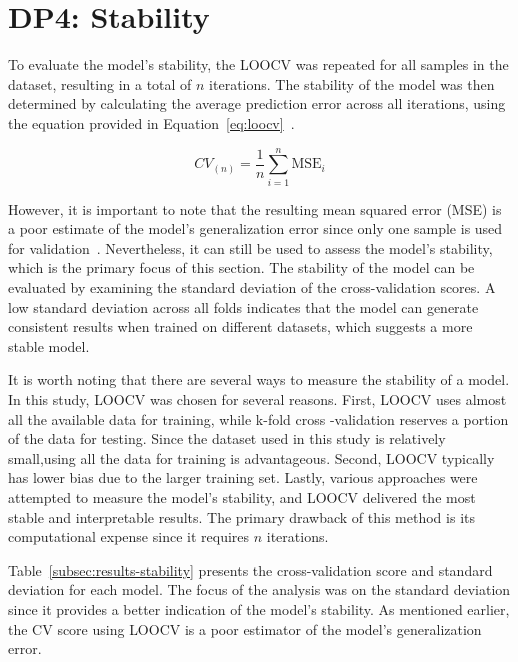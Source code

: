 \section{DP4: Stability}\label{sec:stability}

To evaluate the model's stability, the \ac{LOOCV} was repeated for all samples in the dataset, resulting in a total
of $n$ iterations.
The stability of the model was then determined by calculating the average prediction error across all iterations,
using the equation provided in Equation~\ref{eq:loocv}~\cite[p. 201]{gareth2013introduction}.

\begin{tcolorbox}[arc=0pt,boxrule=0.5pt]
    \begin{equation}
        CV_{(n)} = \frac{1}{n} \sum_{i=1}^{n} \text{MSE}_{i}\label{eq:loocv}
    \end{equation}
\end{tcolorbox}

However, it is important to note that the resulting mean squared error (\ac{MSE}) is a poor estimate of the model's
generalization error since only one sample is used for validation~\cite[p. 201]{gareth2013introduction}.
Nevertheless, it can still be used to assess the model's stability, which is the primary focus of this section.
The stability of the model can be evaluated by examining the standard deviation of the cross-validation scores.
A low standard deviation across all folds indicates that the model can generate consistent results when trained on
different
datasets, which suggests a more stable model.

It is worth noting that there are several ways to measure the stability of a model. In this study, \ac{LOOCV} was
chosen for several reasons.
First, \ac{LOOCV} uses almost all the available data for training, while k-fold cross -validation reserves a portion
of the data for testing.
Since the dataset used in this study is relatively small,using all the data for training is advantageous.
Second, \ac{LOOCV} typically has lower bias due to the larger training set.
Lastly, various approaches were attempted to measure the model's stability, and \ac{LOOCV} delivered
the most stable and interpretable results.
The primary drawback of this method is its computational expense since it
requires $n$ iterations.

Table~\ref{subsec:results-stability} presents the cross-validation score and standard deviation for each model. The
focus of the analysis was on the standard deviation since it provides a better indication of the model's stability.
As mentioned earlier, the \ac{CV} score using \ac{LOOCV} is a poor estimator of the model's generalization error.

